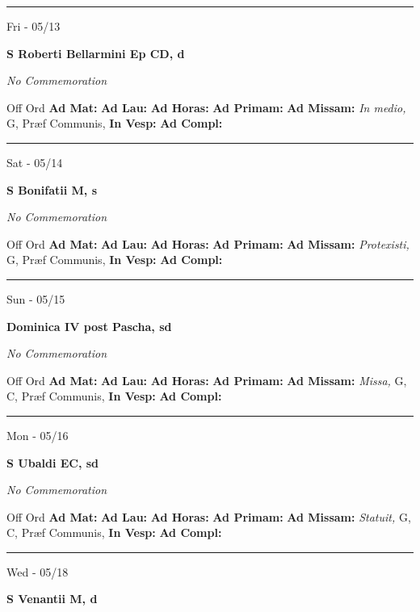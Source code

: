 \documentclass[letterpaper, 10pt]{article}
\begin{document}
\hrule
\begin{center}
Fri - 05/13
\end{center}\textbf{ \large S Roberti Bellarmini Ep CD, \textnormal{\normalsize d}}

\textit{No Commemoration}\begin{justify}
Off Ord
\textbf{Ad Mat: }
\textbf{Ad Lau: }
\textbf{Ad Horas: }
\textbf{Ad Primam: }
\textbf{Ad Missam:} \textit{In medio, } G, Præf Communis, 
\textbf{In Vesp: }
\textbf{Ad Compl: }\end{justify}



\hrule
\begin{center}
Sat - 05/14
\end{center}\textbf{ \large S Bonifatii M, \textnormal{\normalsize s}}

\textit{No Commemoration}\begin{justify}
Off Ord
\textbf{Ad Mat: }
\textbf{Ad Lau: }
\textbf{Ad Horas: }
\textbf{Ad Primam: }
\textbf{Ad Missam:} \textit{Protexisti, } G, Præf Communis, 
\textbf{In Vesp: }
\textbf{Ad Compl: }\end{justify}



\hrule
\begin{center}
Sun - 05/15
\end{center}\textbf{ \large Dominica IV post Pascha, \textnormal{\normalsize sd}}

\textit{No Commemoration}\begin{justify}
Off Ord
\textbf{Ad Mat: }
\textbf{Ad Lau: }
\textbf{Ad Horas: }
\textbf{Ad Primam: }
\textbf{Ad Missam:} \textit{Missa, } G, C, Præf Communis, 
\textbf{In Vesp: }
\textbf{Ad Compl: }\end{justify}



\hrule
\begin{center}
Mon - 05/16
\end{center}\textbf{ \large S Ubaldi EC, \textnormal{\normalsize sd}}

\textit{No Commemoration}\begin{justify}
Off Ord
\textbf{Ad Mat: }
\textbf{Ad Lau: }
\textbf{Ad Horas: }
\textbf{Ad Primam: }
\textbf{Ad Missam:} \textit{Statuit, } G, C, Præf Communis, 
\textbf{In Vesp: }
\textbf{Ad Compl: }\end{justify}



\hrule
\begin{center}
Wed - 05/18
\end{center}\textbf{ \large S Venantii M, \textnormal{\normalsize d}}
\end{document}
